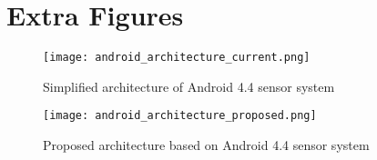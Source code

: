 \section{Extra Figures}
\label{sec:extraFigures}


\begin{figure}[p]
	\texttt{[image: android\_architecture\_current.png]}
	\caption{Simplified architecture of Android 4.4 sensor system}
    \label{fig:androidArchCurrent}
\end{figure}

\begin{figure}[p]
	\texttt{[image: android\_architecture\_proposed.png]}
	\caption{Proposed architecture based on Android 4.4 sensor system}
    \label{fig:androidArchProposed}
\end{figure}
